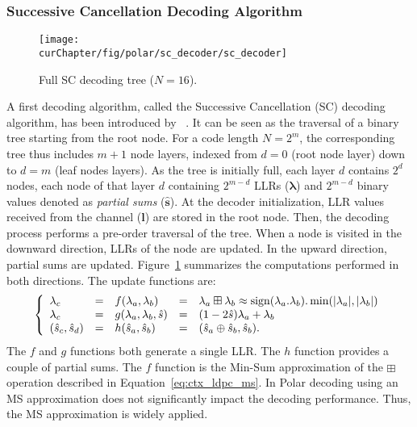 \subsubsection{Successive Cancellation Decoding Algorithm}

\begin{figure}[htp]
  \centering
  \texttt{[image: \\curChapter/fig/polar/sc\_decoder/sc\_decoder]}
  \caption{Full SC decoding tree ($N = 16$).}
  \label{fig:ctx_polar_sc_decoder}
\end{figure}

A first decoding algorithm, called the Successive Cancellation (SC) decoding
algorithm, has been introduced by \Arikan~\cite{Arikan2009}. It can be seen as
the traversal of a binary tree starting from the root node. For a code length
$N=2^m$, the corresponding tree thus includes $m + 1$ node layers, indexed from
$d=0$ (root node layer) down to $d=m$ (leaf nodes layers). As the tree is
initially full, each layer $d$ contains $2^d$ nodes, each node of that layer $d$
containing $2^{m-d}$ LLRs ($\bm{\lambda}$) and $2^{m-d}$ binary values denoted
as \textit{partial sums} ($\bm{\hat{s}}$). At the decoder initialization, LLR
values received from the channel ($\bm{l}$) are stored in the root node. Then,
the decoding process performs a pre-order traversal of the tree. When a node is
visited in the downward direction, LLRs of the node are updated. In the upward
direction, partial sums are updated. Figure~\ref{fig:ctx_polar_sc_decoder}
summarizes the computations performed in both directions. The update functions
are:
\begin{eqnarray}
\left\{\begin{array}{l c l c l}
\lambda_c &=& f(\lambda_a,\lambda_b) &=& \lambda_a \boxplus \lambda_b \approx \operatorname*{sign}(\lambda_a.\lambda_b).\min(|\lambda_a|,|\lambda_b|)\\
\lambda_c &=& g(\lambda_a,\lambda_b,\hat{s})&=&(1-2\hat{s})\lambda_a+\lambda_b\\
(\hat{s}_{c}, \hat{s}_{d}) &=& h(\hat{s}_{a}, \hat{s}_{b}) &=& (\hat{s}_{a} \oplus \hat{s}_{b}, \hat{s}_{b}).
\end{array}\right.
\label{eq:ctx_polar_f_g_h}
\end{eqnarray}
The $f$ and $g$ functions both generate a single LLR. The $h$ function provides
a couple of partial sums. The $f$ function is the Min-Sum approximation of the
$\boxplus$ operation described in Equation~\ref{eq:ctx_ldpc_ms}. In Polar
decoding using an MS approximation does not significantly impact the decoding
performance. Thus, the MS approximation is widely applied.

